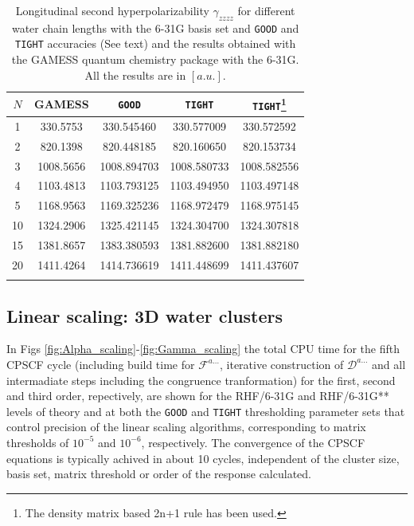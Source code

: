 \documentclass[prl,aps,letterpaper,twocolumn,showpacs,twocolumngrid,superbib]{revtex4}
\def\F{\mathcal{F}}
\def\D{\mathcal{D}}
\begin{document}
\begin{table}
  \centering
  \caption{\protect
    Longitudinal second hyperpolarizability $\gamma_{zzzz}$
    for different water chain lengths with the 6-31G basis set
    and {\tt GOOD} and {\tt TIGHT} accuracies (See text) and the results obtained with
    the GAMESS quantum chemistry package \cite{gamess} with the 6-31G. 
    All the results are in $[a.u.]$.
  }\label{tab:Gamma_1D_Values}
  \begin{tabular}{ccccc}
    \toprule
    $N$ &\multicolumn{1}{c}{{\sc GAMESS}}
    &\multicolumn{1}{c}{{\tt GOOD}}
    &\multicolumn{1}{c}{{\tt TIGHT}}
    &\multicolumn{1}{c}{{\tt TIGHT}\footnote[1]{The density matrix based 2n+1 rule has been used.}} \\
    \hline
     1 &  330.5753 &  330.545460 &  330.577009 &  330.572592 \\
     2 &  820.1398 &  820.448185 &  820.160650 &  820.153734 \\
     3 & 1008.5656 & 1008.894703 & 1008.580733 & 1008.582556 \\
     4 & 1103.4813 & 1103.793125 & 1103.494950 & 1103.497148 \\
     5 & 1168.9563 & 1169.325236 & 1168.972479 & 1168.975145 \\
    10 & 1324.2906 & 1325.421145 & 1324.304700 & 1324.307818 \\
    15 & 1381.8657 & 1383.380593 & 1381.882600 & 1381.882180 \\
    20 & 1411.4264 & 1414.736619 & 1411.448699 & 1411.437607 \\
    \botrule
  \end{tabular}
\end{table}

\subsection{Linear scaling: 3D water clusters}

In Figs \ref{fig:Alpha_scaling}-\ref{fig:Gamma_scaling} the total CPU time for 
the fifth CPSCF cycle (including build time
for $\F^{a\ldots}$, iterative construction of $\D^{a\ldots}$ and all intermadiate
steps including the congruence tranformation) for the first, second and third
order, repectively, are shown for the RHF/6-31G and RHF/6-31G** levels of
theory and at both the {\tt GOOD} and {\tt TIGHT} thresholding parameter 
sets that control precision of the linear scaling algorithms, corresponding 
to matrix thresholds of $10^{-5}$ and $10^{-6}$, respectively. The convergence
of the CPSCF equations is typically achived in about 10 cycles, independent of the
cluster size, basis set, matrix threshold or order of the response calculated.
\end{document}
